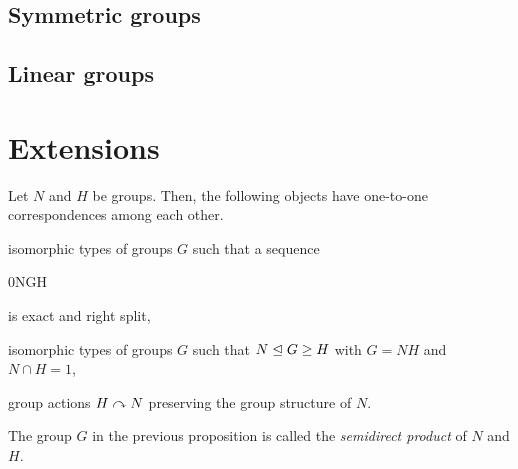 \documentclass{../exp}
\begin{document}
\subsection{Symmetric groups}

\subsection{Linear groups}

\section{Extensions}

\begin{prop}
Let $N$ and $H$ be groups.
Then, the following objects have one-to-one correspondences among each other.
\begin{cond}
\item isomorphic types of groups $G$ such that a sequence \begin{es}0\>N\>G\>H\end{es} is exact and right split,
\item isomorphic types of groups $G$ such that $N\trianglelefteq G\ge H$ with $G=NH$ and $N\cap H=1$,
\item group actions $H\curvearrowright N$ preserving the group structure of $N$.
\end{cond}
\end{prop}
\begin{defn}
The group $G$ in the previous proposition is called the \emph{semidirect product} of $N$ and $H$.
\end{defn}
\end{document}
